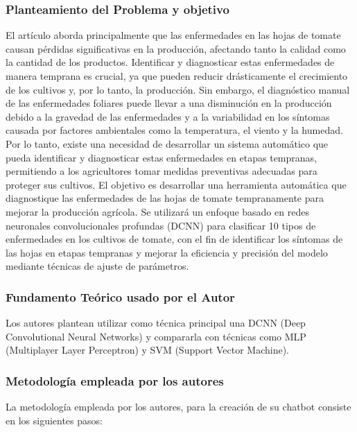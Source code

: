 \subsubsection{Planteamiento del Problema y objetivo }

El artículo aborda principalmente que las enfermedades en las hojas de tomate causan pérdidas significativas en la producción, afectando tanto la calidad como la cantidad de los productos. Identificar y diagnosticar estas enfermedades de manera temprana es crucial, ya que pueden reducir drásticamente el crecimiento de los cultivos y, por lo tanto, la producción. Sin embargo, el diagnóstico manual de las enfermedades foliares puede llevar a una disminución en la producción debido a la gravedad de las enfermedades y a la variabilidad en los síntomas causada por factores ambientales como la temperatura, el viento y la humedad. Por lo tanto, existe una necesidad de desarrollar un sistema automático que pueda identificar y diagnosticar estas enfermedades en etapas tempranas, permitiendo a los agricultores tomar medidas preventivas adecuadas para proteger sus cultivos. El objetivo es desarrollar una herramienta automática que diagnostique las enfermedades de las hojas de tomate tempranamente para mejorar la producción agrícola. Se utilizará un enfoque basado en redes neuronales convolucionales profundas (DCNN) para clasificar 10 tipos de enfermedades en los cultivos de tomate, con el fin de identificar los síntomas de las hojas en etapas tempranas y mejorar la eficiencia y precisión del modelo mediante técnicas de ajuste de parámetros.

\subsubsection{Fundamento Teórico usado por el Autor}

Los autores plantean utilizar como técnica principal una DCNN (Deep Convolutional Neural Networks) y compararla con técnicas como MLP (Multiplayer Layer Perceptron) y SVM (Support Vector Machine).



\subsubsection{Metodología empleada por los autores}
La metodología empleada por los autores, para la creación de su chatbot consiste en los siguientes pasos: 

